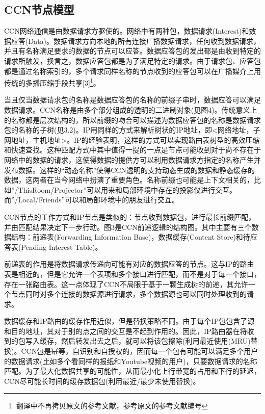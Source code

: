 \subsection{CCN节点模型}
CCN网络通信是由数据请求方驱使的。网络中有两种包，数据请求(Interest)和数据应答(Data)。数据请求方向本地的所有连接广播数据请求，任何收到数据请求，并且有名称满足要求的数据的节点可以应答。数据应答包的发出都是由收到特定的请求所触发，换言之，数据应答包都是为了满足特定的请求。由于请求包、应答包都是通过名称索引的，多个请求同样名称的节点收到的应答包可以在广播媒介上用传统的多播压缩手段共享[3]\footnote{翻译中不再拷贝原文的参考文献，参考原文的参考文献编号}。
\par
当且仅当数据请求包的名称是数据应答包的名称的前缀子串时，数据应答可以满足数据请求。CCN名称是由多个部分组成的透明的二进制对象(见图4)。传统意义上的名称都是层次结构的，所以前缀的吻合可以描述为数据应答包的名称是数据请求包的名称的子树(见3.2)。IP用同样的方式来解析树状的IP地址，即<网络地址，子网地址，主机地址>。IP的经验表明，这样的方式可以实现路由表树型的高效压缩和快速查找。这种匹配方式中其中值得一提的一点是节点可能收到对于尚不存在于网络中的数据的请求，这使得数据的提供方可以利用数据请求方指定的名称产生并发布数据。这样的“动态名称”使得CCN透明的支持动态生成的数据和静态缓存的数据，这两者在当今网络中扮演了重要角色。名称前缀也可能是上下文相关的，比如”/ThisRoom/Projector”可以用来和局部环境中存在的投影仪进行交互。而”/Local/Friends”可以和局部环境中的朋友进行交互。
\par
CCN节点的工作方式和IP节点是类似的：节点收到数据包，进行最长前缀匹配，并由匹配结果决定下一步行动。图3是CCN前递逻辑的结构图。其中主要有三个数据结构：前递表(Forwarding Information Base)，数据缓存(Content Store)和待应答表(Pending Interest Table)。
\par
前递表的作用是将数据请求传递向可能有对应的数据应答的节点。这与IP的路由表是相近的，但是它允许一个表项和多个接口进行匹配，而不是对于每一个接口，存在一张路由表。这一点体现了CCN不局限于基于一颗生成树的前递，其允许一个节点同时对多个连接的数据源进行请求，多个数据源也可以同时处理收到的请求。
\par
数据缓存和IP路由的缓存作用近似，但是替换策略不同。由于每个IP包包含了源和目的地址，其对于别的点之间的交互是不起到作用的。因此，IP路由器在将收到的包写入缓存，然后转发出去之后，就可以将该包擦除(利用最近使用(MRU)替换)。CCN包是幂等，自识别和自授权的，因而每一个包有可能可以满足多个用户的数据请求(比如多个看同样的报纸和Youtube视频的用户)，只要数据请求的名称匹配。为了最大化数据共享的可能性，从而最小化上行带宽的占用和下行的延迟，CCN尽可能长时间的缓存数据包(利用最近/最少未使用替换)。
\par

